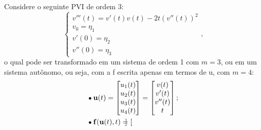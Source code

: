 \documentclass[../differential_methods.tex]{subfiles}
\begin{document}
\begin{example}
	Considere o seguinte PVI de ordem 3:
	\[
		\left\{\begin{array}{ll}
			v'''(t)=v'(t)v(t)-2t(v''(t))^{2} \\
			v_{0}=\eta_1                     \\
			v'(0)=\eta_2                     \\
			v''(0)=\eta_3
		\end{array}\right.,
	\]
	o qual pode ser transformado em um sistema de ordem 1 com \(m=3\), ou em um sistema autônomo, ou seja, com a f escrita apenas em termos de u, com \(m=4\):
	\begin{align*}
		 & \tikz[baseline=-0.5ex]\draw[black, fill=black, radius=1.5pt](0, 0)circle;\; \mathbf{u}(t)=\begin{bmatrix}
			                                                                                             u_1(t)   \\
			                                                                                             u_2(t)   \\
			                                                                                             u_{3}(t) \\
			                                                                                             u_{4}(t)
		                                                                                             \end{bmatrix} = \begin{bmatrix}
			                                                                                                             v(t)   \\
			                                                                                                             v'(t)  \\
			                                                                                                             v''(t) \\
			                                                                                                             t
		                                                                                                             \end{bmatrix};        \\
		 & \tikz[baseline=-0.5ex]\draw[black, fill=black, radius=1.5pt](0, 0)circle;\; \mathbf{f}(\mathbf{u}(t), t) = \begin{bmatrix}

\end{bmatrix}
\end{align*}
\end{example}
\end{document}
